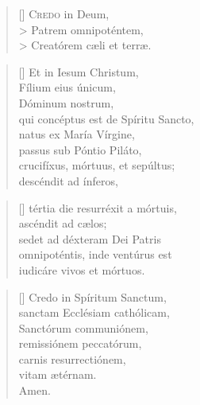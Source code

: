 \documentclass{article}
\begin{document}
\begin{mdframed}
\settowidth{\versewidth}{Et ne nos ind\'ucas in tentati\'onem}

\begin{verse}[\versewidth]
\lettrine[lhang=1.0,nindent=0em]{C}{redo} in Deum, \\>
Patrem omnipot\'entem,\\>
Creat\'orem c\ae li et terr\ae .\\
\end{verse}

\begin{verse}[\versewidth]
Et in Iesum Christum, \\
F\'ilium eius \'unicum, \\
D\'ominum nostrum, \\
qui conc\'eptus est de Sp\'iritu Sancto, \\
natus ex Mar\'ia V\'irgine, \\
passus sub P\'ontio Pil\'ato, \\
crucif\'ixus, m\'ortuus, et sep\'ultus; \\
desc\'endit ad \'inferos, \\[4\baselineskip]
\end{verse}
\end{mdframed}

\begin{mdframed}
\poemtitle{ }
\settowidth{\versewidth}{Et ne nos ind\'ucas in tentati\'onem}

\begin{verse}[\versewidth]
t\'ertia die resurr\'exit a m\'ortuis, \\
asc\'endit ad c\ae los; \\
sedet ad d\'exteram Dei Patris \\
omnipot\'entis, inde vent\'urus est \\
iudic\'are vivos et m\'ortuos.
\end{verse}

\begin{verse}[\versewidth]
Credo in Sp\'iritum Sanctum, \\
sanctam Eccl\'esiam cath\'olicam, \\
Sanct\'orum communi\'onem, \\
remissi\'onem peccat\'orum, \\
carnis resurrecti\'onem, \\
vitam \ae t\'ernam. \\
Amen.\\[4\baselineskip]
\end{verse}
\end{mdframed}
\end{document}
